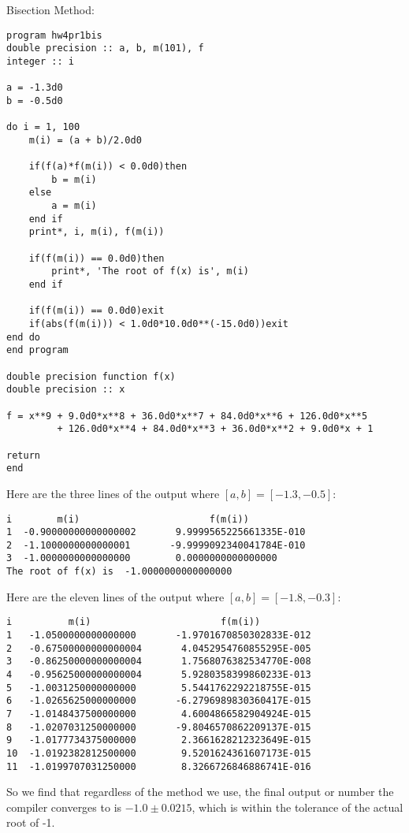 \documentclass[12pt]{article}
\begin{document}
\bigskip
\noindent Bisection Method:
\begin{verbatim}
program hw4pr1bis
double precision :: a, b, m(101), f
integer :: i 

a = -1.3d0
b = -0.5d0

do i = 1, 100
	m(i) = (a + b)/2.0d0
	
	if(f(a)*f(m(i)) < 0.0d0)then
		b = m(i)
	else
		a = m(i)
	end if
	print*, i, m(i), f(m(i))
	
	if(f(m(i)) == 0.0d0)then
		print*, 'The root of f(x) is', m(i)
	end if
	
	if(f(m(i)) == 0.0d0)exit
	if(abs(f(m(i))) < 1.0d0*10.0d0**(-15.0d0))exit
end do
end program

double precision function f(x)
double precision :: x

f = x**9 + 9.0d0*x**8 + 36.0d0*x**7 + 84.0d0*x**6 + 126.0d0*x**5
         + 126.0d0*x**4 + 84.0d0*x**3 + 36.0d0*x**2 + 9.0d0*x + 1

return
end
\end{verbatim}

\bigskip
\noindent Here are the three lines of the output where $[a,b]=[-1.3,-0.5]$:
\begin{verbatim}
i        m(i)                       f(m(i))
1  -0.90000000000000002       9.9999565225661335E-010
2  -1.1000000000000001       -9.9999092340041784E-010
3  -1.0000000000000000        0.0000000000000000
The root of f(x) is  -1.0000000000000000
\end{verbatim}

\bigskip
\noindent Here are the eleven lines of the output where $[a,b]=[-1.8,-0.3]$:
\begin{verbatim}
i          m(i)                       f(m(i))
1   -1.0500000000000000       -1.9701670850302833E-012
2   -0.67500000000000004       4.0452954760855295E-005
3   -0.86250000000000004       1.7568076382534770E-008
4   -0.95625000000000004       5.9280358399860233E-013
5   -1.0031250000000000        5.5441762292218755E-015
6   -1.0265625000000000       -6.2796989830360417E-015
7   -1.0148437500000000        4.6004866582904924E-015
8   -1.0207031250000000       -9.8046570862209137E-015
9   -1.0177734375000000        2.3661628212323649E-015
10  -1.0192382812500000        9.5201624361607173E-015
11  -1.0199707031250000        8.3266726846886741E-016
\end{verbatim}

\bigskip

So we find that regardless of the method we use, the final output or number the compiler converges to is $-1.0 \pm 0.0215$, which is within the tolerance of the actual root of -1.
\end{document}
